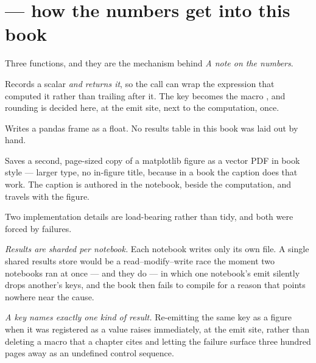 \section{ --- how the numbers get into this book}
\label{app:cmp:report}

Three functions, and they are the mechanism behind \emph{A note on the numbers}.

\begin{description}[leftmargin=1.2em, style=nextline, font=\normalfont\ttfamily\small]
  \item[report.value(key, v, fmt=...)] Records a scalar \emph{and returns it}, so the call can wrap
  the expression that computed it rather than trailing after it. The key 
  becomes the macro , and rounding is decided here, at the emit
  site, next to the computation, once.

  \item[report.table(df, key, caption=...)] Writes a pandas frame as a  float. No
  results table in this book was laid out by hand.

  \item[report.figure(fig, key, caption=...)] Saves a second, page-sized copy of a matplotlib
  figure as a vector PDF in book style --- larger type, no in-figure title, because in a book the
  caption does that work. The caption is authored in the notebook, beside the computation, and
  travels with the figure.
\end{description}

Two implementation details are load-bearing rather than tidy, and both were forced by failures.

\emph{Results are sharded per notebook.} Each notebook writes only its own file. A single shared
results store would be a read--modify--write race the moment two notebooks ran at once --- and they
do --- in which one notebook's emit silently drops another's keys, and the book then fails to
compile for a reason that points nowhere near the cause.

\emph{A key names exactly one kind of result.} Re-emitting the same key as a figure when it was
registered as a value raises immediately, at the emit site, rather than deleting a macro that a
chapter cites and letting the failure surface three hundred pages away as an undefined control
sequence.

